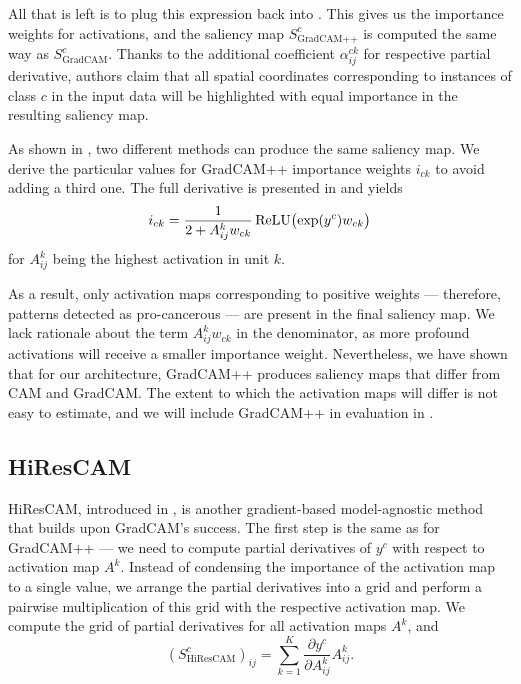 All that is left is to plug this expression back into .
This gives us the importance weights for activations, and the saliency map $S^c_{\text{GradCAM++}}$ is computed the same way as $S^c_{\text{GradCAM}}$.
Thanks to the additional coefficient $\alpha^{ck}_{ij}$ for respective partial derivative, authors claim that all spatial coordinates corresponding to instances of class $c$ in the input data will be highlighted with equal importance in the resulting saliency map.

As shown in , two different methods can produce the same saliency map.
We derive the particular values for GradCAM++ importance weights $i_{ck}$ to avoid adding a third one.
The full derivative is presented in  and yields
\begin{equation}
    i_{ck} = \frac{1}{2 + A^k_{ij}w_{ck}} \operatorname{ReLU}\bigl(\exp(y^c)w_{ck}\bigr)
\end{equation}
for $A^k_{ij}$ being the highest activation in unit $k$.

As a result, only activation maps corresponding to positive weights --- therefore, patterns detected as pro-cancerous --- are present in the final saliency map.
We lack rationale about the term $A^k_{ij} w_{ck}$ in the denominator, as more profound activations will receive a smaller importance weight.
Nevertheless, we have shown that for our architecture, GradCAM++ produces saliency maps that differ from CAM and GradCAM.
The extent to which the activation maps will differ is not easy to estimate, and we will include GradCAM++ in evaluation in .

\subsection{HiResCAM}\label{sub:hirescam}

HiResCAM, introduced in \cite{hires-cam}, is another gradient-based model-agnostic method that builds upon GradCAM's success.
The first step is the same as for GradCAM++ --- we need to compute partial derivatives of $y^c$ with respect to activation map $A^k$.
Instead of condensing the importance of the activation map to a single value, we arrange the partial derivatives into a grid and perform a pairwise multiplication of this grid with the respective activation map.
We compute the grid of partial derivatives for all activation maps $A^k$, and
\begin{equation}
    (S^c_{\text{HiResCAM}})_{ij}
        = \sum_{k=1}^K \frac{\partial y^c}{\partial A^k_{ij}} A^k_{ij}.
\end{equation}

